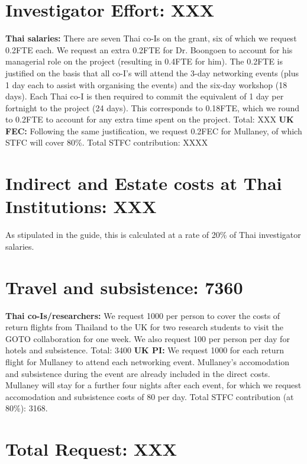 \documentclass[11pt]{article}
\begin{document}
\vspace{-3mm}
\section{Investigator Effort: XXX}
\vspace{-3mm}
{\bf Thai salaries:} There are seven Thai co-Is on the grant, six of which we request 0.2FTE each. We request an extra 0.2FTE for Dr. Boongoen to account for his managerial role on the project (resulting in 0.4FTE for him). The 0.2FTE is justified on the basis that all co-I's will attend the 3-day networking events (plus 1 day each to assist with organising the events) and the six-day workshop (18 days). Each Thai co-I is then required to commit the equivalent of 1 day per fortnight to the project (24 days). This corresponds to 0.18FTE, which we round to 0.2FTE to account for any extra time spent on the project. Total: XXX {\bf UK FEC:} Following the same justification, we request 0.2FEC for Mullaney, of which STFC will cover 80\%. Total STFC contribution: XXXX

\vspace{-3mm}
\section{Indirect and Estate costs at Thai Institutions: XXX}
\vspace{-3mm}
As stipulated in the guide, this is calculated at a rate of 20\% of Thai investigator salaries.

\vspace{-3mm}
\section{Travel and subsistence: 7360}
\vspace{-3mm}
{\bf Thai co-Is/researchers:} We request 1000 per person to cover the costs of return flights from Thailand to the UK for two research students to visit the GOTO collaboration for one week. We also request 100 per person per day for hotels and subsistence. Total: 3400 {\bf UK PI:} We request 1000 for each return flight for Mullaney to attend each networking event. Mullaney's accomodation and subsistence during the event are already included in the direct costs. Mullaney will stay for a further four nights after each event, for which we request accomodation and subsistence costs of 80 per day. Total STFC contribution (at 80\%): 3168.

\section{Total Request: XXX}
\end{document}
